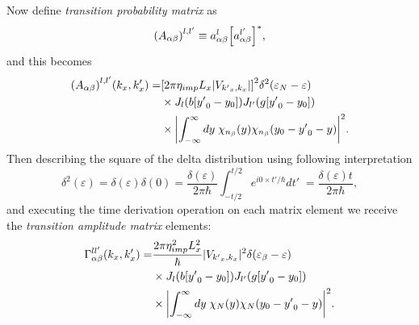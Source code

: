 Now define \textit{transition probability matrix} as
\begin{equation} \label{eq_c37}
    \qty(A_{\alpha\beta})^{l,l'} \equiv
    a^l_{\alpha\beta}\qty[a^{l'}_{\alpha\beta}]^{*},
\end{equation}
and this becomes
\begin{equation} \label{eq_c38}
  \begin{aligned}
      \qty(A_{\alpha\beta})^{l,l'}(k_x,k'_x) = &
      \qty[{ 2 \pi \eta_{imp} L_x |V_{{k'}_x,k_x}|}]^2
      \delta^2(\varepsilon_{N} - \varepsilon) \\
      & \times
      J_l\qty(b[{y'}_0 - y_0]) J_{l'}\qty(g[{y'}_0 - y_0])\\
      & \times
      \qty|
      \int_{-\infty}^{\infty} dy \;
      {\chi}_{n_{\beta}}\qty(y)
      {\chi}_{n_{\beta}}\qty(y_0 - {y'}_0 - y)|^2.
  \end{aligned}
\end{equation}
Then describing the square of the delta distribution using following interpretation \cite{dini16,kibis14}
\begin{equation} \label{eq_c39}
    \delta^2(\varepsilon) =
    \delta(\varepsilon)\delta(0) =
    \frac{\delta(\varepsilon)}{2\pi \hbar}
    \int_{-t/2}^{t/2} e^{i0\times t'/\hbar} dt'\; =
    \frac{\delta(\varepsilon)t}{2\pi \hbar},
\end{equation}
and executing the time derivation operation on each matrix element we receive the \textit{transition amplitude matrix} elements:
\begin{equation} \label{eq_40}
  \begin{aligned}
    \Gamma_{\alpha\beta}^{ll'}(k_x,k'_x) = &
    \frac { 2\pi \eta_{imp}^2 L_x^2}{ \hbar} |V_{{k'}_x,k_x}|^2
    \delta(\varepsilon_{\beta} - \varepsilon)\\
    & \times
    J_l\qty(b[{y'}_0 - y_0]) J_{l'}\qty(g[{y'}_0 - y_0]) \\
    & \times
    \qty|
    \int_{-\infty}^{\infty} dy \;
    {\chi}_{N}\qty(y)
    {\chi}_{N}\qty(y_0 - {y'}_0 - y)|^2.
  \end{aligned}
\end{equation}

